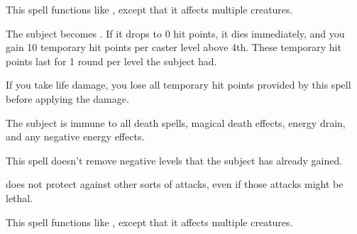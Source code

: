 \begin{spelleffect}
    This spell functions like , except that it affects multiple creatures.
\end{spelleffect}

\begin{spellblood}
    The subject becomes \vulnerable. If it drops to 0 hit points, it dies immediately, and you gain 10 temporary hit points  per caster level above 4th. These temporary hit points last for 1 round per level the subject had.

    If you take life damage, you lose all temporary hit points provided by this spell before applying the damage.
\end{spellblood}

\spelldur{\durshort}
\begin{spelleffect}
    The subject is immune to all death spells, magical death effects, energy drain, and any negative energy effects.
\end{spelleffect}
\begin{spellnotes}
    This spell doesn't remove negative levels that the subject has already gained.
    \par {} does not protect against other sorts of attacks, even if those attacks might be lethal.
\end{spellnotes}

\begin{spelleffect}
    This spell functions like , except that it affects multiple creatures.
\end{spelleffect}

